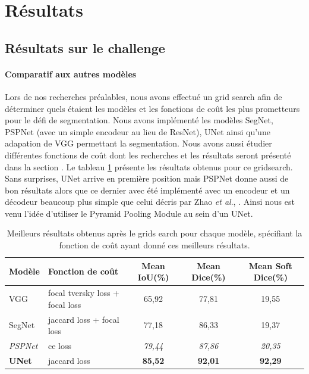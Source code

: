 \documentclass[french, english]{article}
\newcommand{\etal}{\textit{et al}., }
\begin{document}
\section{Résultats}

\subsection{Résultats sur le challenge}
\paragraph{Comparatif aux autres modèles}
\label{comp:models}
Lors de nos recherches préalables, nous avons effectué un grid search afin de déterminer quels étaient les modèles et les fonctions de coût les plus prometteurs pour le défi de segmentation. Nous avons implémenté les modèles SegNet, PSPNet (avec un simple encodeur au lieu de ResNet), UNet ainsi qu'une adapation de VGG permettant la segmentation. Nous avons aussi étudier différentes fonctions de coût dont les recherches et les résultats seront présenté dans la section . Le tableau \ref{tab:baseline} présente les résultats obtenus pour ce gridsearch. Sans surprises, UNet arrive en première position mais PSPNet donne aussi de bon résultats alors que ce dernier avec été implémenté avec un encodeur et un décodeur beaucoup plus simple que celui décris par Zhao \etal\cite{PSPNet}. Ainsi nous est venu l'idée d'utiliser le Pyramid Pooling Module au sein d'un UNet.

\begin{table}[h]
    \centering
    \footnotesize
    \begin{tabular}{l l c c c}
        \hline
        Modèle & Fonction de coût & Mean IoU(\%) & Mean Dice(\%) & Mean Soft Dice(\%)\\
        \hline
        \hline
        VGG & focal tversky loss + focal loss & 65,92 & 77,81 & 19,55\\
        SegNet & jaccard loss + focal loss & 77,18 & 86,33 & 19,37\\
        \textit{PSPNet} & ce loss & \textit{79,44} & \textit{87,86} & \textit{20,35}\\
        \textbf{UNet} & jaccard loss & \textbf{85,52} & \textbf{92,01} & \textbf{92,29}\\
        \hline
    \end{tabular}
    \caption{Meilleurs résultats obtenus après le grids earch pour chaque modèle, spécifiant la fonction de coût ayant donné ces meilleurs résultats.}
    \label{tab:baseline}
\end{table}
\end{document}
